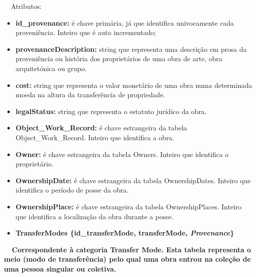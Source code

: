 \documentclass[letterpaper]{article}
\newcommand\textstyleStrongEmphasis[1]{\textbf{#1}}
\newcommand\liststyleLi{%
\renewcommand\labelitemi{{\textbullet}}
\renewcommand\labelitemii{[27A2?]}
\renewcommand\labelitemiii{{\textbullet}}
\renewcommand\labelitemiv{{\textbullet}}
}
\newcommand\liststyleLxiv{%
\renewcommand\labelitemi{[27A2?]}
\renewcommand\labelitemii{[27A2?]}
\renewcommand\labelitemiii{[27A2?]}
\renewcommand\labelitemiv{[27A2?]}
}
\begin{document}
{
\ \ Atributos:}

\liststyleLxiv
\begin{itemize}
\item {
\textbf{id\_provenance: }\'e chave prim\'aria, j\'a que identifica
univocamente cada proveni\^encia. Inteiro que \'e auto incrementado;}
\item {
\textbf{provenanceDescription: }string que representa uma
descri\c{c}\~ao em prosa da proveni\^encia ou hist\'oria dos
propriet\'arios de uma obra de arte, obra arquitet\'onica ou grupo.}
\item {
\textbf{cost: }string que representa o valor monet\'ario de uma obra
numa determinada moeda na altura da transfer\^encia de propriedade.}
\item {
\textbf{legalStatus:} string que representa o estatuto jur\'idico da
obra.}
\item {
\textbf{Object\_Work\_Record:}\textit{ }\'e chave estrangeira da tabela
Object\_Work\_Record. Inteiro que identifica a obra.\ \ }
\item {
\textbf{Owner:} \'e chave estrangeira da tabela Owners. Inteiro que
identifica o propriet\'ario.}
\item {
\textbf{OwnershipDate:} \'e chave estrangeira da tabela OwnershipDates.
Inteiro que identifica o per\'iodo de posse da obra.}
\item {
\textbf{OwnershipPlace:} \'e chave estrangeira da tabela
OwnershipPlaces. Inteiro que identifica a localiza\c{c}\~ao da obra
durante a posse.}


\bigskip
\end{itemize}
\liststyleLi
\begin{itemize}
\item {\bfseries
TransferModes\textmd{ \{}\textmd{id\_transferMode}\textmd{,
transferMode, }\textmd{\textit{Provenance}}\textmd{\}}}
\end{itemize}
{\bfseries
\foreignlanguage{english}{\textmd{\ \ Correspondente \`a categoria
}}\textstyleStrongEmphasis{\foreignlanguage{english}{Transfer
Mode}}\foreignlanguage{english}{\textmd{. Esta
}}\textstyleStrongEmphasis{\foreignlanguage{english}{\textmd{tabela}}}\foreignlanguage{english}{\textmd{
representa o meio (modo de transfer\^encia) pelo qual uma obra entrou
na cole\c{c}\~ao de uma pessoa singular ou coletiva.}}}
\end{document}
